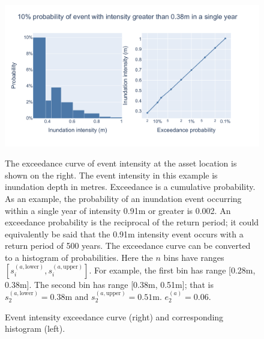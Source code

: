 \documentclass[a4paper,11pt]{extarticle} %
\begin{document}
\begin{figure}[ht]

    \begin{framed}

        \includegraphics[width=\textwidth]{plots/fig_intensity.pdf}

    \end{framed}

    \footnotesize

    \renewcommand{\arraystretch}{1.01}

    \vspace{-3ex}

    {\justify
        The exceedance curve of event intensity at the asset location is shown on the right. The event intensity in this example is inundation depth in metres. Exceedance is a cumulative probability. As an example, the probability of an inundation event occurring within a single year of intensity 0.91m or greater is 0.002. An exceedance probability is the reciprocal of the return period; it could equivalently be said that the 0.91m intensity event occurs with a return period of 500 years.
        The exceedance curve can be converted to a histogram of probabilities. Here the $n$ bins have ranges $[s^{(a, \text{lower})}_i, s^{(a, \text{upper})}_i]$. For example, the first bin has range [0.28m, 0.38m]. The second bin has range [0.38m,    0.51m]; that is $s^{(a, \text{lower})}_2 = 0.38$m and $s^{(a, \text{upper})}_2 = 0.51$m. $e^{(a)}_2 = 0.06$.
        \par}

    \vspace{-0.5ex}

    \caption{\small Event intensity exceedance curve (right) and corresponding histogram (left).}
    \label{Fig:intensity}

\end{figure}
\end{document}

